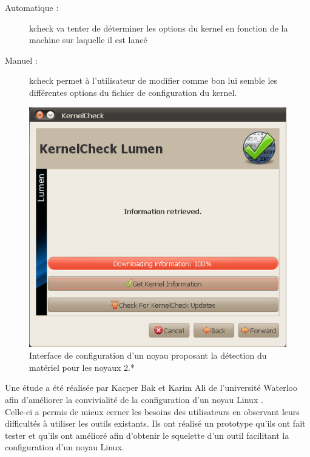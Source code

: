 \documentclass[16pts]{report}
\begin{document}
\begin{description}
    \begin{description}
        \item[Automatique :] kcheck va tenter de déterminer les options du kernel
            en fonction de la machine sur laquelle il est lancé
        \item[Manuel :] kcheck permet à l’utilisateur de modifier comme bon lui
            semble les différentes options du fichier de configuration du kernel.
    \end{description}
        \begin{figure}[H]
            \includegraphics[scale=0.8]{illustrations/kernel_check.png}
            \centering
            \caption{Interface de configuration d'un noyau proposant la détection du matériel pour les noyaux 2.*}
            \label{fig:KernelCheck}
        \end{figure}
\end{description}

Une étude a été réalisée par Kacper Bak et Karim Ali de l’université Waterloo
afin d’améliorer la convivialité de la configuration d’un noyau Linux
\cite{Waterloo:Etude}.
\\

Celle-ci a permis de mieux cerner les besoins des utilisateurs en observant
leurs difficultés à utiliser les outils existants. Ils ont réalisé un prototype
qu’ils ont fait tester et qu’ils ont amélioré afin d’obtenir le squelette d’un
outil facilitant la configuration d’un noyau Linux. \\
\\
\end{document}
